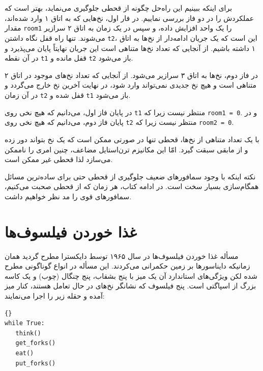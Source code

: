 \documentclass{book}
\newcommand{\clearemptydoublepage}{\newpage\cleardoublepage}
\begin{document}

    برای اینکه ببینیم این راه‌حل چگونه از قحطی جلوگیری می‌نماید، بهتر است که عملکردش را در دو فاز بررسی نماییم. 
    در فار اول، نخ‌هایی که به اتاق ۱ وارد شده‌اند، مقدار {\tt room1} را یک واحد افزایش داده، و سپس در یک زمان به اتاق ۲ سرازیر می‌شوند. 
    تنها راه قفل نگاه داشتن  {\tt t2}، این است که یک جریان ادامه‌دار از نخ‌ها به اتاق ۱ داشته باشیم. 
    از آنجایی که تعداد نخ‌ها متناهی است این جریان نهایتاً پایان می‌پذیرد و در آن نقطه {\tt t1} قفل مانده و  {\tt t2} باز می‌شود. 
    
    در فاز دوم، نخ‌ها به اتاق ۳ سرازیر می‌شود. از آنجایی که تعداد نخ‌های موجود در اتاق ۲ متناهی است و هیچ نخ جدیدی نمی‌تواند وارد شود، 
    در نهایت آخرین نخ خارج می‌گردد و در آن زمان  {\tt t2} قفل شده و  {\tt t1} باز می‌شود. 

    در پایان فاز اول، می‌دانیم که هیچ نخی روی  {\tt t1} منتظر نیست زیرا که {\tt room1 = 0}.
    و در پایان فاز دوم، می‌دانیم که هیچ نخی روی {\tt t2} منتظر نیست زیرا که {\tt room2 = 0}. 

    با یک تعداد متناهی از نخ‌ها، قحطی تنها در صورتی ممکن است که یک نخ بتواند دور زده و از مابقی سبقت گیرد.
    امّا این مکانیزم ترن‌استایل مضاعف، چنین امری را ناممکن می‌سازد لذا قحطی غیر ممکن است. 

    نکته اینکه با وجود سمافورهای ضعیف جلوگیری از قحطی حتی برای ساده‌ترین مسائل همگام‌سازی بسیار سخت است.
    در ادامه کتاب، هر زمان که از قحطی صحبت می‌کنیم، سمافورهای قوی را مد نظر خواهیم داشت. 


\clearemptydoublepage
\section{غذا خوردن فیلسوف‌ها}
\label{dining}

    مسأله غذا خوردن فیلسوف‌ها در سال ۱۹۶۵ توسط دایکسترا مطرح گردید همان زمانیکه دایناسورها بر زمین حکمرانی می‌کردند\cite{dijkstra65}. 
    این مسأله در انواع گوناگونی مطرح شده لکن ویژگی‌های استاندارد آن یک میز با پنج بشقاب، پنج چنگال (چوب) و یک کاسه بزرگ از اسپاگتی است. 
    پنج فیلسوف که نشانگر نخ‌های در حال تعامل هستند، کنار میز آمده و حقله زیر را اجرا می‌نمایند: 
    
\begin{latin}
\begin{lstlisting}[title=\rl{حلقهٔ اصلی فیلسوف}]{}
while True:
   think()
   get_forks()
   eat()
   put_forks()
\end{lstlisting}
\end{latin}
\end{document}
